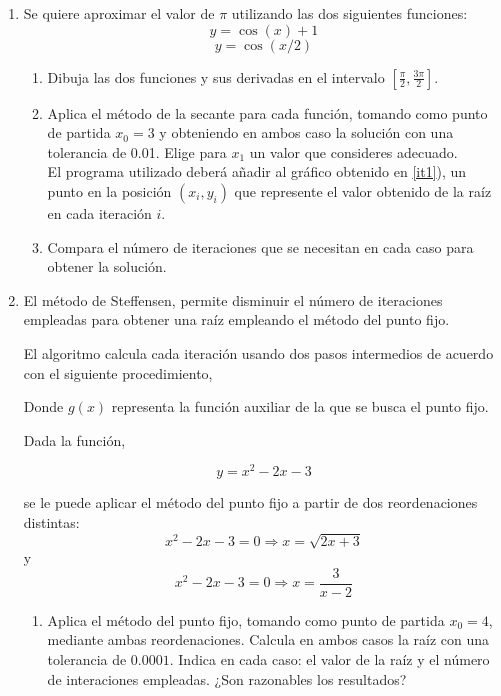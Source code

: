 \begin{enumerate}
\item Se quiere aproximar el valor de $\pi$ utilizando las dos siguientes funciones:
\begin{equation*}
y=\cos(x)+1
\end{equation*}
\begin{equation*}
y=\cos(x/2)
\end{equation*}
\begin{enumerate}
\item \label{it1}Dibuja las dos funciones y sus derivadas en el intervalo $[\frac{\pi}{2},\frac{3\pi}{2}]$.
\item Aplica el método de la secante para cada función, tomando como punto de partida  $x_0=3$ y obteniendo en ambos caso la solución con una tolerancia de 0.01. Elige para $x_1$ un valor que consideres adecuado.\\
El programa utilizado deberá añadir al gráfico obtenido en  \ref{it1}), un punto en la posición $(x_i,y_i)$ que represente el valor obtenido de la raíz en cada iteración $i$.
\item Compara el número de iteraciones que se necesitan en cada caso para obtener la solución.
\end{enumerate}
\item El método de Steffensen, permite disminuir el número de iteraciones empleadas para obtener una raíz empleando el método del punto fijo.

El algoritmo calcula cada iteración usando dos pasos intermedios de acuerdo con el siguiente procedimiento,


Donde $g(x)$ representa la función auxiliar de la que se busca el punto fijo.


Dada la función,

\begin{equation*}
y= x^2-2x-3
\end{equation*} 

se le puede aplicar el método del punto fijo a  partir de dos reordenaciones distintas:
\begin{equation}
x^2-2x-3=0 \Rightarrow x=\sqrt{2x+3}
\end{equation}
y
\begin{equation}
x^2-2x-3=0 \Rightarrow x=\frac{3}{x-2}
\end{equation}
\begin{enumerate}
\item Aplica el método del punto fijo, tomando como punto de partida $x_0=4$, mediante ambas reordenaciones. Calcula en ambos casos la raíz con una tolerancia de $0.0001$. Indica en cada caso: el valor de la raíz y el número de interaciones empleadas.  ¿Son razonables los resultados?


\end{enumerate}
\end{enumerate}
